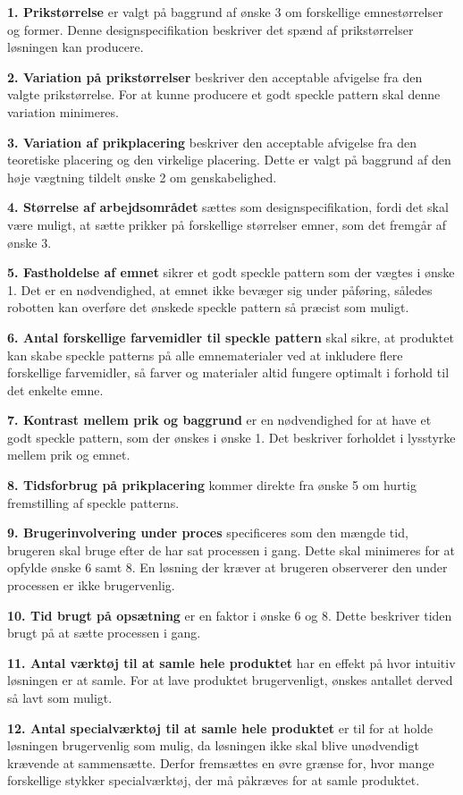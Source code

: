 \textbf{1. Prikstørrelse} er valgt på baggrund af ønske 3 om forskellige emnestørrelser og former. Denne designspecifikation beskriver det spænd af prikstørrelser løsningen kan producere. 

\textbf{2. Variation på prikstørrelser} beskriver den acceptable afvigelse fra den valgte prikstørrelse. For at kunne producere et godt speckle pattern skal denne variation minimeres.

\textbf{3. Variation af prikplacering} beskriver den acceptable afvigelse fra den teoretiske placering og den virkelige placering. Dette er valgt på baggrund af den høje vægtning tildelt ønske 2 om genskabelighed. 

\textbf{4. Størrelse af arbejdsområdet} sættes som designspecifikation, fordi det skal være muligt, at sætte prikker på forskellige størrelser emner, som det fremgår af ønske 3. 

\textbf{5. Fastholdelse af emnet} sikrer et godt speckle pattern som der vægtes i ønske 1. Det er en nødvendighed, at emnet ikke bevæger sig under påføring, således robotten kan overføre det ønskede speckle pattern så præcist som muligt.

\textbf{6. Antal forskellige farvemidler til speckle pattern} skal sikre, at produktet kan skabe speckle patterns på alle emnematerialer ved at inkludere flere forskellige farvemidler, så farver og materialer altid fungere optimalt i forhold til det enkelte emne.

\textbf{7. Kontrast mellem prik og baggrund} er en nødvendighed for at have et godt speckle pattern, som der ønskes i ønske 1. Det beskriver forholdet i lysstyrke mellem prik og emnet.

\textbf{8. Tidsforbrug på prikplacering} kommer direkte fra ønske 5 om hurtig fremstilling af speckle patterns. 

\textbf{9. Brugerinvolvering under proces} specificeres som den mængde tid, brugeren skal bruge efter de har sat processen i gang. Dette skal minimeres for at opfylde ønske 6 samt 8. En løsning der kræver at brugeren observerer den under processen er ikke brugervenlig.
  
\textbf{10. Tid brugt på opsætning} er en faktor i ønske 6 og 8. Dette beskriver tiden brugt på at sætte processen i gang.

\textbf{11. Antal værktøj til at samle hele produktet} har en effekt på hvor intuitiv løsningen er at samle. For at lave produktet brugervenligt, ønskes antallet derved så lavt som muligt.

\textbf{12. Antal specialværktøj til at samle hele produktet} er til for at holde løsningen brugervenlig som mulig, da løsningen ikke skal blive unødvendigt krævende at sammensætte. Derfor fremsættes en øvre grænse for, hvor mange forskellige stykker specialværktøj, der må påkræves for at samle produktet.

